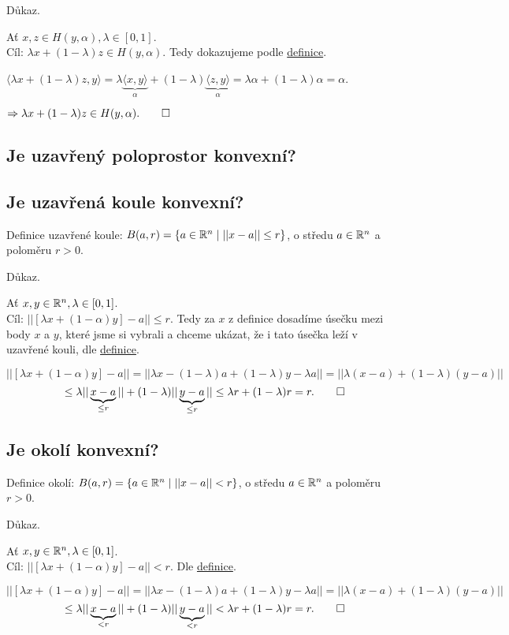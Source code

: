 Důkaz.

Ať $x,z \in H(y, \alpha), \lambda \in [0,1]$.\\
Cíl: $\lambda x + (1-\lambda) z \in H(y, \alpha)$. Tedy dokazujeme podle \hyperref[sec:konvex]{definice}.

$\langle \lambda x + (1-\lambda)z, y \rangle = \lambda \underbrace{\langle x,y \rangle}_{\alpha} + (1-\lambda)
\underbrace{\langle z,y \rangle}_{\alpha} = \lambda \alpha + (1-\lambda) \alpha = \alpha$.

$\Rightarrow \lambda x + (1-\lambda)z \in H(y, \alpha). \qed$

\subsection{Je uzavřený poloprostor konvexní?}

\subsection{Je uzavřená koule konvexní?}
Definice uzavřené koule: $B(a,r) = \left\lbrace a \in \mathbb{R}^n \mid ||x -a || \leq r \right\rbrace$, o středu $a \in \mathbb{R}^n$ a poloměru $r > 0$.

Důkaz.

Ať $x,y \in \mathbb{R}^n, \lambda \in [0,1]$.\\
Cíl: $|| [\lambda x + (1-\alpha)y] - a || \leq r$. Tedy za $x$ z definice dosadíme úsečku mezi body $x$ a $y$, které jsme
si vybrali a chceme ukázat, že i tato úsečka leží v uzavřené kouli, dle \hyperref[sec:konvex]{definice}.

\[
    || [\lambda x + (1-\alpha)y] - a || = || \lambda x - (1-\lambda)a + (1-\lambda)y - \lambda a || =
    || \lambda (x-a) + (1-\lambda)(y-a) ||
\]
\[
    \leq \lambda ||\underbrace{x-a}_{\leq r}|| +  (1-\lambda)||\underbrace{y-a}_{\leq r}|| \leq \lambda r + (1-\lambda)r
     = r. \qed
\]

\subsection{Je okolí konvexní?}
Definice okolí: $B(a,r) = \left\lbrace a \in \mathbb{R}^n \mid ||x -a || < r \right\rbrace$, o středu $a \in \mathbb{R}^n$ a poloměru $r > 0$.

Důkaz.

Ať $x,y \in \mathbb{R}^n, \lambda \in [0,1]$.\\
Cíl: $|| [\lambda x + (1-\alpha)y] - a || < r$. Dle \hyperref[sec:konvex]{definice}.

\[
    || [\lambda x + (1-\alpha)y] - a || = || \lambda x - (1-\lambda)a + (1-\lambda)y - \lambda a || =
    || \lambda (x-a) + (1-\lambda)(y-a) ||
\]
\[
    \leq \lambda ||\underbrace{x-a}_{< r}|| +  (1-\lambda)||\underbrace{y-a}_{< r}|| < \lambda r + (1-\lambda)r
     = r. \qed
\]

